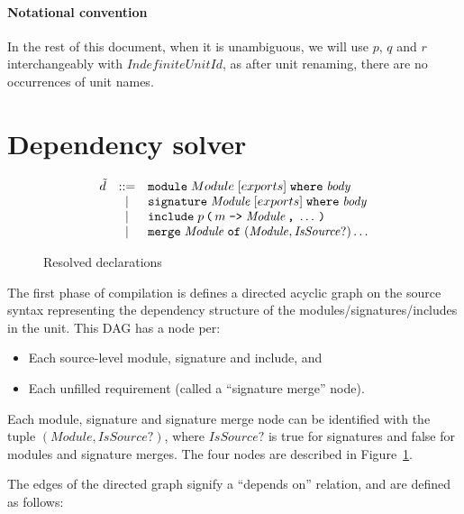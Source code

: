 \documentclass{article}
\newcommand{\I}[1]{\ensuremath{\mathit{#1}}}
\begin{document}
\paragraph{Notational convention}
In the rest of this document, when it is unambiguous, we will use $p$, $q$ and $r$
interchangeably with \I{IndefiniteUnitId}, as after unit renaming, there
are no occurrences of unit names.

\newpage
\section{Dependency solver}

\begin{figure}[htpb]
$$
\begin{array}{rcll}
  \tilde{d} & ::= & \verb|module|\;    Module \; [exports]\; \verb|where|\; \I{body} \\
    & |   & \verb|signature|\; \I{Module} \; [exports]\; \verb|where|\; \I{body} \\
    & |   & \verb|include|\; p\,\verb|(|\, m\; \verb|->|\; \I{Module}\,\verb|,|\;\ldots\,\verb|)| \\
    & |   & \verb|merge|\; \I{Module}\; \verb|of|\; (\I{Module}, \I{IsSource?}) \ldots
\end{array}
$$
\caption{Resolved declarations} \label{fig:resolved}
\end{figure}

The first phase of compilation is defines a directed acyclic graph on
the source syntax representing the dependency structure of the
modules/signatures/includes in the unit. This DAG has a node per:

\begin{itemize}
    \item Each source-level module, signature and include, and
    \item Each unfilled requirement (called a ``signature merge'' node).
\end{itemize}
%
Each module, signature and signature merge node can be identified
with the tuple $\left(\I{Module}, \I{IsSource?}\right)$, where \I{IsSource?}
is true for signatures and false for modules and signature merges.
The four nodes are described in Figure~\ref{fig:resolved}.

The edges of the directed graph signify a ``depends on'' relation, and are
defined as follows:
\end{document}
